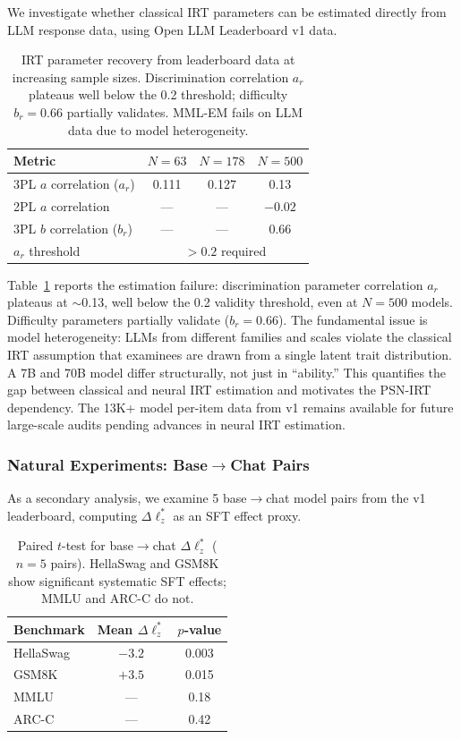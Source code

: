 \documentclass[11pt,a4paper]{article}
\begin{document}
We investigate whether classical IRT parameters can be estimated directly from LLM response data, using Open LLM Leaderboard v1 data.

\begin{table}[t]
\centering
\small
\begin{tabular}{lccc}
\toprule
\textbf{Metric} & $N=63$ & $N=178$ & $N=500$ \\
\midrule
3PL $a$ correlation ($a_r$) & 0.111 & 0.127 & 0.13 \\
2PL $a$ correlation & --- & --- & $-0.02$ \\
3PL $b$ correlation ($b_r$) & --- & --- & 0.66 \\
$a_r$ threshold & \multicolumn{3}{c}{$> 0.2$ required} \\
\bottomrule
\end{tabular}
\caption{IRT parameter recovery from leaderboard data at increasing sample sizes. Discrimination correlation $a_r$ plateaus well below the 0.2 threshold; difficulty $b_r = 0.66$ partially validates. MML-EM fails on LLM data due to model heterogeneity.}
\label{tab:irt_refit}
\end{table}

Table~\ref{tab:irt_refit} reports the estimation failure: discrimination parameter correlation $a_r$ plateaus at $\sim$0.13, well below the 0.2 validity threshold, even at $N = 500$ models. Difficulty parameters partially validate ($b_r = 0.66$). The fundamental issue is model heterogeneity: LLMs from different families and scales violate the classical IRT assumption that examinees are drawn from a single latent trait distribution. A 7B and 70B model differ structurally, not just in ``ability.'' This quantifies the gap between classical and neural IRT estimation and motivates the PSN-IRT dependency. The 13K+ model per-item data from v1 remains available for future large-scale audits pending advances in neural IRT estimation.

\subsubsection{Natural Experiments: Base$\to$Chat Pairs}

As a secondary analysis, we examine 5 base$\to$chat model pairs from the v1 leaderboard, computing $\Delta\ell_z^*$ as an SFT effect proxy.

\begin{table}[t]
\centering
\small
\begin{tabular}{lcc}
\toprule
\textbf{Benchmark} & \textbf{Mean $\Delta\ell_z^*$} & \textbf{$p$-value} \\
\midrule
HellaSwag & $-3.2$ & 0.003 \\
GSM8K & $+3.5$ & 0.015 \\
MMLU & --- & 0.18 \\
ARC-C & --- & 0.42 \\
\bottomrule
\end{tabular}
\caption{Paired $t$-test for base$\to$chat $\Delta\ell_z^*$ ($n=5$ pairs). HellaSwag and GSM8K show significant systematic SFT effects; MMLU and ARC-C do not.}
\label{tab:natural}
\end{table}
\end{document}
